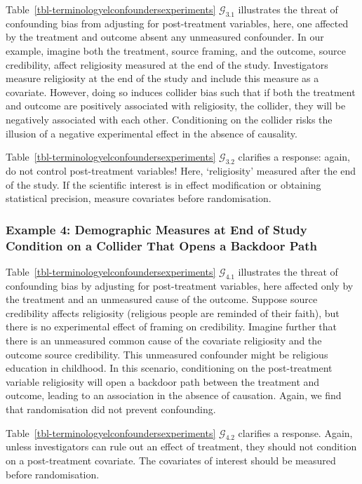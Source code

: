 \documentclass[
  single column]{article}
\begin{document}
Table~\ref{tbl-terminologyelconfoundersexperiments}
\(\mathcal{G}_{3.1}\) illustrates the threat of confounding bias from
adjusting for post-treatment variables, here, one affected by the
treatment and outcome absent any unmeasured confounder. In our example,
imagine both the treatment, source framing, and the outcome, source
credibility, affect religiosity measured at the end of the study.
Investigators measure religiosity at the end of the study and include
this measure as a covariate. However, doing so induces collider bias
such that if both the treatment and outcome are positively associated
with religiosity, the collider, they will be negatively associated with
each other. Conditioning on the collider risks the illusion of a
negative experimental effect in the absence of causality.

Table~\ref{tbl-terminologyelconfoundersexperiments}
\(\mathcal{G}_{3.2}\) clarifies a response: again, do not control
post-treatment variables! Here, `religiosity' measured after the end of
the study. If the scientific interest is in effect modification or
obtaining statistical precision, measure covariates before
randomisation.

\subsubsection{Example 4: Demographic Measures at End of Study Condition
on a Collider That Opens a Backdoor
Path}\label{example-4-demographic-measures-at-end-of-study-condition-on-a-collider-that-opens-a-backdoor-path}

Table~\ref{tbl-terminologyelconfoundersexperiments}
\(\mathcal{G}_{4.1}\) illustrates the threat of confounding bias by
adjusting for post-treatment variables, here affected only by the
treatment and an unmeasured cause of the outcome. Suppose source
credibility affects religiosity (religious people are reminded of their
faith), but there is no experimental effect of framing on credibility.
Imagine further that there is an unmeasured common cause of the
covariate religiosity and the outcome source credibility. This
unmeasured confounder might be religious education in childhood. In this
scenario, conditioning on the post-treatment variable religiosity will
open a backdoor path between the treatment and outcome, leading to an
association in the absence of causation. Again, we find that
randomisation did not prevent confounding.

Table~\ref{tbl-terminologyelconfoundersexperiments}
\(\mathcal{G}_{4.2}\) clarifies a response. Again, unless investigators
can rule out an effect of treatment, they should not condition on a
post-treatment covariate. The covariates of interest should be measured
before randomisation.
\end{document}
